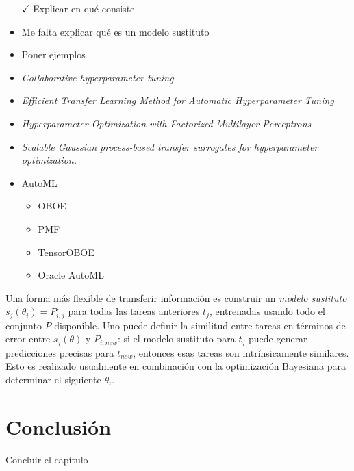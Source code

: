 \begin{itemize}
	\item[$\checkmark$] Explicar en qué consiste
	\item Me falta explicar qué es un modelo sustituto
	\item Poner ejemplos
	\item \textit{Collaborative hyperparameter tuning}
	\item \textit{Efficient Transfer Learning Method for Automatic Hyperparameter Tuning}
	\item \textit{Hyperparameter Optimization with Factorized Multilayer Perceptrons}
	\item \textit{Scalable Gaussian process-based transfer surrogates for hyperparameter optimization.}
	\item AutoML \begin{itemize}
		\item OBOE
		\item PMF
		\item TensorOBOE
		\item Oracle AutoML
	\end{itemize}
\end{itemize}

\quad

Una forma más flexible de transferir información es construir un \textit{modelo sustituto} $s_j(\theta_i) = P_{i,j}$ para todas las tareas anteriores $t_j$, entrenadas usando todo el conjunto $P$ disponible. Uno puede definir la similitud entre tareas en términos de error entre $s_j(\theta)$ y $P_{i, new}$: si el modelo sustituto para $t_j$ puede generar predicciones precisas para $t_{new}$, entonces esas tareas son intrínsicamente similares. Esto es realizado usualmente en combinación con la optimización Bayesiana para determinar el siguiente $\theta_i$. 



\section{Conclusión}\label{sec:conclusion}

Concluir el capítulo


